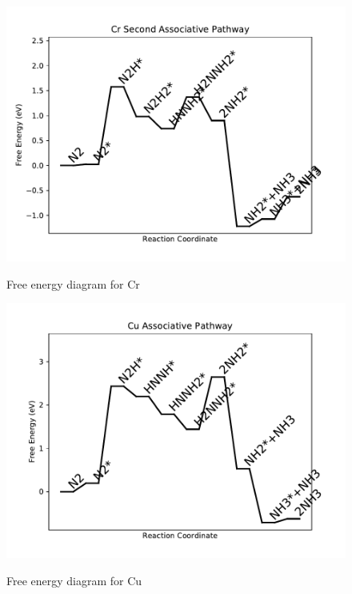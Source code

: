 \documentclass{article}
\begin{document}
\begin{figure}
\includegraphics[width=1\linewidth]{data/plots/Cr_associative_2.pdf}
\label{fig:Cr_associative_2}
\caption{Free energy diagram for Cr}
\end{figure}

\clearpage
\begin{figure}
\includegraphics[width=1\linewidth]{data/plots/Cu_associative.pdf}
\label{fig:Cu_associative}
\caption{Free energy diagram for Cu}
\end{figure}
\end{document}
